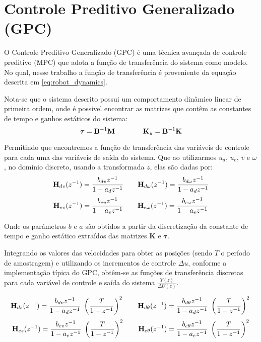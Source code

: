 \section{Controle Preditivo Generalizado (GPC)}

O Controle Preditivo Generalizado (GPC) é uma 
técnica avançada de controle preditivo (MPC) 
que adota a função de transferência do sistema 
como modelo. No qual, nesse trabalho a função de transferência é proveniente 
da equação descrita em \ref{eq:robot_dynamics}.

\vspace{1em}
Nota-se que o sistema descrito possui um comportamento dinâmico linear de
primeira ordem, onde é possivel encontrar as matrizes que contêm 
as constantes de tempo e ganhos estáticos do sistema:
\begin{equation}
\boldsymbol{\tau} = \mathbf{B}^{-1} \mathbf{M} \\
\qquad
\qquad
\mathbf{K}_u = \mathbf{B}^{-1} \mathbf{K}
\end{equation}

Permitindo que encontremos a função de transferência das variáveis 
de controle para cada uma das variáveis de saída do sistema. 
Que ao utilizarmos $u_d$, $u_e$, $v$ e $\omega$,
no domínio discreto, usando a transformada $z$, elas são dadas por:
\[
\mathbf{H}_{d v}(z^{-1}) = \frac{b_{d v} z^{-1}}{1 - a_{d} z^{-1}} \\
\qquad
\mathbf{H}_{d \omega}(z^{-1}) = \frac{b_{d \omega} z^{-1}}{1 - a_{d} z^{-1}} \\
\]
\[
\mathbf{H}_{e v}(z^{-1}) = \frac{b_{e v} z^{-1}}{1 - a_{e} z^{-1}} \\
\qquad
\mathbf{H}_{e \omega}(z^{-1}) = \frac{b_{e \omega} z^{-1}}{1 - a_{e} z^{-1}}
\]

Onde os parâmetros $b$ e $a$ são obtidos a partir da discretização 
da constante de tempo e ganho estático extraídos das matrizes
$\mathbf{K}$ e $\boldsymbol{\tau}$.

\vspace{1em}
Integrando os valores das velocidades para obter as posições 
(sendo $T$ o período de amostragem) e utilizando os incrementos 
de controle $\Delta u$, conforme a implementação típica do GPC, 
obtêm-se as funções de transferência discretas para cada variável 
de controle e saída do sistema $\frac{Y(z)}{\Delta U(z)}$.

\[
\mathbf{H}_{d s}(z^{-1}) = \frac{b_{d v} z^{-1}}{1 - a_{d} z^{-1}} \; \left(\frac{T}{1 - z^{-1}}\right)^2\\
\qquad
\mathbf{H}_{d \theta}(z^{-1}) = \frac{b_{d \theta} z^{-1}}{1 - a_{d} z^{-1}} \; \left(\frac{T}{1 - z^{-1}}\right)^2\\
\]
\[
\mathbf{H}_{e s}(z^{-1}) = \frac{b_{e v} z^{-1}}{1 - a_{e} z^{-1}} \; \left(\frac{T}{1 - z^{-1}}\right)^2\\
\qquad
\mathbf{H}_{e \theta}(z^{-1}) = \frac{b_{e \theta} z^{-1}}{1 - a_{e} z^{-1}} \; \left(\frac{T}{1 - z^{-1}}\right)^2
\]

